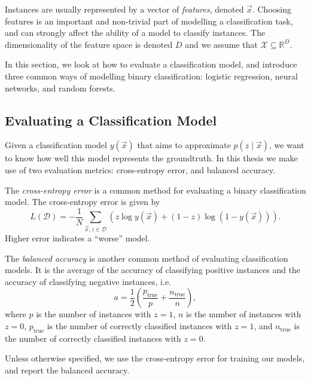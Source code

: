     Instances are usually represented by a vector of \emph{features}, denoted
    $\vec x$. Choosing features is an important and non-trivial part of
    modelling a classification task, and can strongly affect the ability of a
    model to classify instances. The dimensionality of the feature space is
    denoted $D$ and we assume that $\mathcal X \subseteq \mathbb{R}^D$.

    In this section, we look at how to evaluate a classification model, and
    introduce three common ways of modelling binary classification: logistic
    regression, neural networks, and random forests.

    \subsection{Evaluating a Classification Model}
    \label{sec:evaluating-classification-model}

        Given a classification model $y(\vec x)$ that aims to approximate $p(z
        \mid \vec x)$, we want to know how well this model represents the
        groundtruth. In this thesis we make use of two evaluation metrics:
        cross-entropy error, and balanced accuracy.

        The \emph{cross-entropy error} \citep{bishop06} is a common method for
        evaluating a binary classification model. The cross-entropy error is
        given by
        \[
            L(\mathcal D) = -\frac{1}{N} \sum_{\vec x, z \in \mathcal D} \left(
                z \log y(\vec x) + (1 - z) \log (1 - y(\vec x))
            \right).
        \]
        Higher error indicates a ``worse'' model.

        The \emph{balanced accuracy} is another common method of evaluating
        classification models. It is the average of the accuracy of classifying
        positive instances and the accuracy of classifying negative instances,
        i.e.
        \[
            a = \frac{1}{2} \left(\frac{p_{\text{true}}}{p} + \frac{n_{\text{true}}}{n}\right),
        \]
        where $p$ is the number of instances with $z = 1$, $n$ is the number of
        instances with $z = 0$, $p_{\text{true}}$ is the number of correctly
        classified instances with $z = 1$, and $n_{\text{true}}$ is the number
        of correctly classified instances with $z = 0$.

        Unless otherwise specified, we use the cross-entropy error for training
        our models, and report the balanced accuracy.

